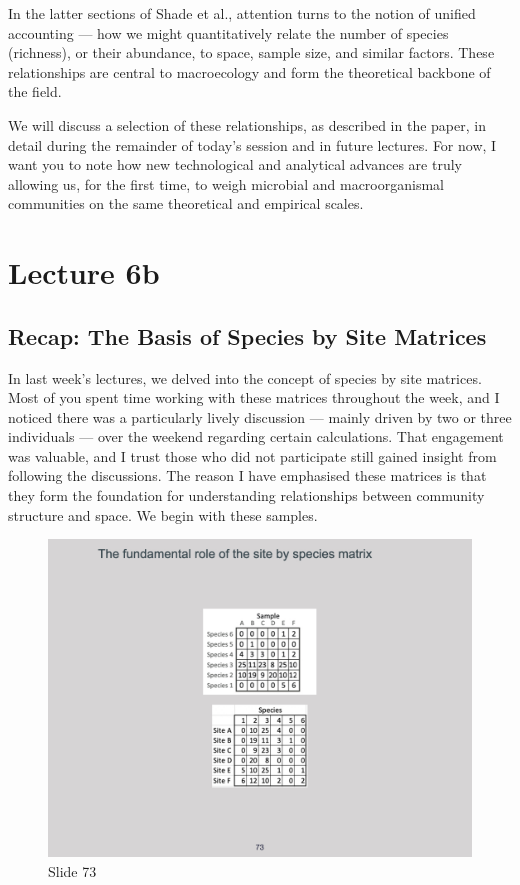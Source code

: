 \documentclass[
  11pt,
]{book}
\begin{document}
In the latter sections of Shade et al., attention turns to the notion of
unified accounting --- how we might quantitatively relate the number of
species (richness), or their abundance, to space, sample size, and
similar factors. These relationships are central to macroecology and
form the theoretical backbone of the field.

We will discuss a selection of these relationships, as described in the
paper, in detail during the remainder of today's session and in future
lectures. For now, I want you to note how new technological and
analytical advances are truly allowing us, for the first time, to weigh
microbial and macroorganismal communities on the same theoretical and
empirical scales.

\chapter*{Lecture 6b}\label{lecture-6b}

\section{Recap: The Basis of Species by Site
Matrices}\label{recap-the-basis-of-species-by-site-matrices}

In last week's lectures, we delved into the concept of species by site
matrices. Most of you spent time working with these matrices throughout
the week, and I noticed there was a particularly lively discussion ---
mainly driven by two or three individuals --- over the weekend regarding
certain calculations. That engagement was valuable, and I trust those
who did not participate still gained insight from following the
discussions. The reason I have emphasised these matrices is that they
form the foundation for understanding relationships between community
structure and space. We begin with these samples.

\begin{figure}[ht]
\centering
\includegraphics[width=0.8\linewidth]{../images/BDC334/BDC334-073.jpeg}
\caption*{Slide 73}
\end{figure}
\end{document}
